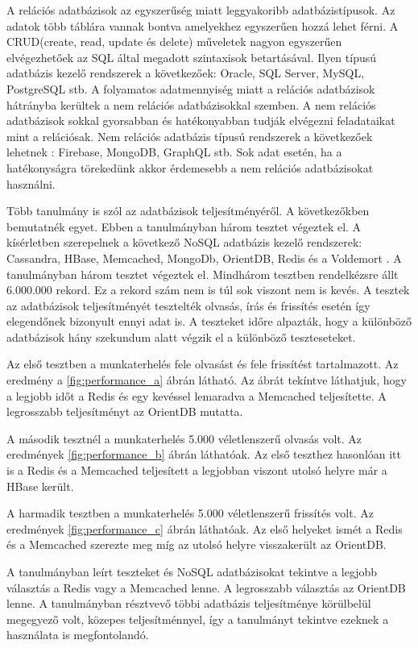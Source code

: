A relációs adatbázisok az egyszerűség miatt leggyakoribb adatbázistípusok. Az adatok több táblára vannak bontva amelyekhez egyszerűen hozzá lehet férni. A CRUD(create, read, update és delete) műveletek nagyon egyszerűen elvégezhetőek az SQL által megadott szintaxisok betartásával. Ilyen típusú adatbázis kezelő rendszerek a következőek: Oracle, SQL Server, MySQL, PostgreSQL stb. A folyamatos adatmennyiség miatt a relációs adatbázisok hátrányba kerültek a nem relációs adatbázisokkal szemben. A nem relációs adatbázisok sokkal gyorsabban és hatékonyabban tudják elvégezni feladataikat mint a relációsak. Nem relációs adatbázis típusú rendszerek a következőek lehetnek \cite{gupta2017nosql}: Firebase, MongoDB, GraphQL stb. Sok adat esetén, ha a hatékonyságra törekedünk akkor érdemesebb a nem relációs adatbázisokat használni. 

Több tanulmány is szól az adatbázisok teljesítményéről. A következőkben bemutatnék egyet. Ebben a tanulmányban három tesztet végeztek el. A kísérletben szerepelnek a következő NoSQL adatbázis kezelő rendszerek: Cassandra, HBase, Memcached, MongoDb, OrientDB, Redis és a Voldemort \cite{martins2019study}. A tanulmányban három tesztet végeztek el. Mindhárom tesztben rendelkézsre állt 6.000.000 rekord. Ez a rekord szám nem is túl sok viszont nem is kevés. A tesztek az adatbázisok teljesítményét tesztelték olvasás, írás és frissítés esetén így elegendőnek bizonyult ennyi adat is. A teszteket időre alpazták, hogy a különböző adatbázisok hány szekundum alatt végzik el a különböző teszteseteket.

Az első tesztben a munkaterhelés fele olvasást és fele frissítést tartalmazott. Az eredmény a \ref{fig:performance_a} ábrán látható. Az ábrát tekíntve láthatjuk, hogy a legjobb időt a Redis és egy kevéssel lemaradva a Memcached teljesítette. A legrosszabb teljesítményt az OrientDB mutatta. 

A második tesztnél a munkaterhelés 5.000 véletlenszerű olvasás volt. Az eredmények \ref{fig:performance_b} ábrán láthatóak. Az első teszthez hasonlóan itt is a Redis és a Memcached teljesített a legjobban viszont utolsó helyre már a HBase került. 

A harmadik tesztben a munkaterhelés 5.000 véletlenszerű frissítés volt. Az eredmények \ref{fig:performance_c} ábrán láthatóak. Az első helyeket ismét a Redis és a Memcached szerezte meg míg az utolsó helyre visszakerült az OrientDB.

A tanulmányban leírt teszteket és NoSQL adatbázisokat tekintve a legjobb választás a Redis vagy a Memcached lenne. A legrosszabb választás az OrientDB lenne. A tanulmányban résztvevő többi adatbázis teljesítménye körülbelül megegyező volt, közepes teljesítménnyel, így a tanulmányt tekintve ezeknek a használata is megfontolandó.

